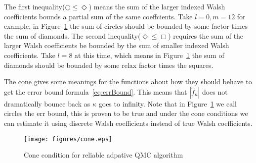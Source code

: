 The first inequality($\bigcirc \leq \Diamond$) means the sum of the larger indexed Walsh coefficients bounds a partial sum of the same coeffcients. 
Take $l=0, m=12$ for example, in Figure~\ref{fg:cone} the sum of circles should be bounded by some factor times the sum of diamonds. The second inequality($\Diamond\leq \Box$) requires the sum of the larger Walsh coefficients be bounded by the sum of smaller indexed Walsh coefficients. 
Take $l=8$ at this time, which means in Figure~\ref{fg:cone} the sum of diamonds should be bounded by some relax factor times the squares.

The cone gives some meanings for the functions about how they should behave to get the error bound formula~\eqref{eq:errBound}. 
This means that $|\hat{f}_\kappa|$ does not dramatically bounce back as $\kappa$ goes to infinity. 
Note that in Figure~\ref{fg:cone} we call circles the err bound, this is proven to be true and under the cone conditions we can estimate it using discrete Walsh coefficients instead of true Walsh coefficients.
\begin{figure}[h]
    \centering
    \texttt{[image: figures/cone.eps]}
    \caption{Cone condition for reliable adpative QMC algorithm}
    \label{fg:cone}
\end{figure}
